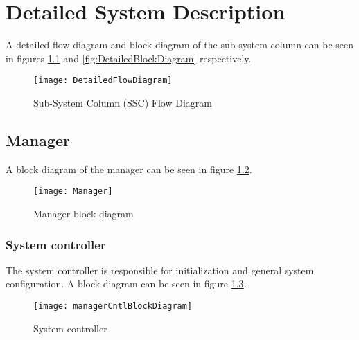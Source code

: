 

\chapter{Detailed System Description}
\label{sec:Detailed System Description}

A detailed flow diagram and block diagram of the sub-system column can be seen in figures \ref{fig:DetailedFlowDiagram} and \ref{fig:DetailedBlockDiagram} respectively.
\begin{figure}[h]
\centering
\captionsetup{justification=centering}
\captionsetup{width=.9\linewidth}
\centerline{
\mbox{\texttt{[image: DetailedFlowDiagram]}}
}
\center\caption{Sub-System Column (SSC) Flow Diagram}
\label{fig:DetailedFlowDiagram}
\end{figure}

\section{Manager}
\label{sec:manager}

A block diagram of the manager can be seen in figure \ref{fig:Manager block diagram}.
\begin{figure}[h]
\centering
\captionsetup{justification=centering}
\captionsetup{width=.9\linewidth}
\centerline{
\mbox{\texttt{[image: Manager]}}
}
\center\caption{Manager block diagram}
\label{fig:Manager block diagram}
\end{figure}

\subsection{System controller}
\label{sec:System controller}

The system controller is responsible for initialization and general system configuration.
A block diagram can be seen in figure \ref{fig:System controller}.

\begin{figure}[h]
\centering
\captionsetup{justification=centering}
\captionsetup{width=.9\linewidth}
\centerline{
\mbox{\texttt{[image: managerCntlBlockDiagram]}}
}
\center\caption{System controller}
\label{fig:System controller}
\end{figure}

